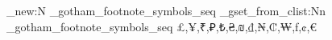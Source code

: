 %
%
\ExplSyntaxOn
\seq_new:N \g_gotham_footnote_symbols_seq
\seq_gset_from_clist:Nn \g_gotham_footnote_symbols_seq { £,¥,₹,₽,₺,₴,₪,₫,₦,₡,₩,ƒ,¢,€ }
\newcommand{\setfootnotesymbols}[1]{%
	\seq_gset_from_clist:Nn \g_gotham_footnote_symbols_seq { #1 }
}
\newcommand{\gothamFnSymbol}[1]{%
	\seq_item:Nn \g_gotham_footnote_symbols_seq
		{ \int_eval:n { \int_mod:nn { #1 - 1 } { \seq_count:N \g_gotham_footnote_symbols_seq } + 1 } }
}
\ExplSyntaxOff
\renewcommand{\thefootnote}{\gothamFnSymbol{\value{footnote}}}
